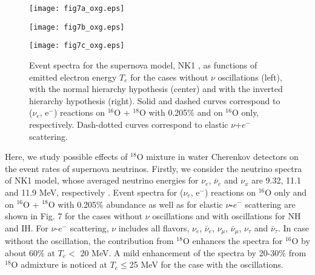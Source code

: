 \documentclass[preprint,12pt]{elsarticle}
\begin{document}
\begin{figure}[htbp]
\vspace*{-3cm}
\hspace{-15mm}
\begin{minipage}{0.45\hsize}
\begin{center}
\texttt{[image: fig7a\_oxg.eps]}
\end{center}
\end{minipage}
\hspace{-15mm}
\begin{minipage}{0.45\hsize}
\begin{center}
\texttt{[image: fig7b\_oxg.eps]}
\end{center}
\end{minipage}
\hspace{-15mm}
\vspace*{-1.0cm}
\begin{minipage}{0.45\hsize}
\begin{center}
\vspace*{-1cm}
\texttt{[image: fig7c\_oxg.eps]}
\end{center}
\end{minipage}
\vspace{-1cm}
\caption{\small 
Event spectra for the supernova model, NK1 \cite{Nakazato2018,Naka2013}, as functions of emitted electron energy $T_e$ for the cases without $\nu$ oscillations (left), with the normal hierarchy hypothesis (center) and with the inverted hierarchy hypothesis (right). 
Solid and dashed curves correspond to ($\nu_e$, e$^{-}$) reactions on $^{16}$O + $^{18}$O with 0.205$\%$ and on $^{16}$O only, respectively. 
Dash-dotted curves correspond to elastic $\nu$+$e^{-}$ scattering.
}
\label{spectra}
\end{figure}


Here, we study possible effects of $^{18}$O mixture in water Cherenkov detectors on the event rates of supernova neutrinos.
Firstly, we consider the neutrino spectra of NK1 model, whose averaged neutrino energies for $\nu_e$, $\bar{\nu}_e$ and $\nu_x$ are 9.32, 11.1 and 11.9 MeV, respectively \cite{Naka2013}.
Event spectra for ($\nu_e$, e$^{-}$) reactions on $^{16}$O only and on $^{16}$O + $^{18}$O with 0.205$\%$ abundance as well as for elastic {\bf $\nu$-$e^{-}$} scattering are shown in Fig. 7 for the cases without $\nu$ oscillations and with oscillations for NH and IH.
For $\nu$-$e^{-}$ scattering, $\nu$ includes all flavors, $\nu_e$, $\bar{\nu}_e$, $\nu_{\mu}$, $\bar{\nu}_{\mu}$, $\nu_{\tau}$ and $\bar{\nu}_{\tau}$.
In case without the oscillation, the contribution from $^{18}$O enhances the spectra for $^{16}$O by about 60$\%$ at $T_{e}<$ 20 MeV.
A mild enhancement of the spectra by 20-30$\%$ from $^{18}$O admixture is noticed at $T_{e} \leq$25 MeV for the case with the oscillations. 
\end{document}
